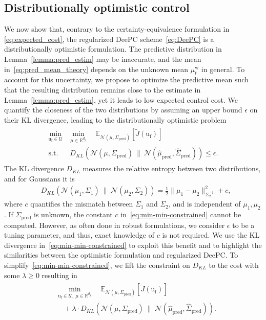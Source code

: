\documentclass[letterpaper, 10 pt, conference]{ieeeconf}
\def\ufr{\mathrm{u}_\mathrm{f}}
\def\mph{\hat{\mu}_\mathrm{pred}}
\def\mw{\mu^\mathrm{w}_t}
\def\Sp{\Sigma_\mathrm{pred}}
\def\Sph{\hat{\Sigma}_\mathrm{pred}}
\def\dy{d_\mathrm{y}}
\begin{document}
\subsection{Distributionally optimistic control}
We now show that, contrary to the certainty-equivalence formulation in \eqref{eq:expected_cost}, the regularized \gls{DeePC} scheme~\eqref{eq:DeePC} is a distributionally optimistic formulation.
The predictive distribution in Lemma~\ref{lemma:pred_estim} may be inaccurate, and the mean in~\eqref{eq:pred_mean_theory} depends on the unknown mean $\mw$ in general.
To account for this uncertainty, we propose to 
optimize the predictive mean such that the resulting distribution remains close to the estimate in Lemma~\ref{lemma:pred_estim}, yet it leads to low expected control cost. 
We quantify the closeness of the two distributions by assuming an upper bound $\epsilon$ on their \gls{KL} divergence, leading to the distributionally optimistic problem
\begin{align} \label{eq:min-min-constrained}
\begin{split}
    \min_{\ufr \in \mathcal{U}} & \min_{\mu\in\mathbb{R}^{\dy}}  \quad  \mathbb{E}_{\mathcal{N}(\mu,\Sp)}[\tilde{J}(\ufr)] \\
    \mathrm{s.t.} & ~ D_{KL}\left(\mathcal{N}(\mu,\Sp)~\big\|~\mathcal{N}\left(\mph,
    \Sph\right) \right) \leq \epsilon.
\end{split}
\end{align}
The \gls{KL} divergence $D_{KL}$ measures the relative entropy between two distributions, and for Gaussians it is~\cite{williams2006gaussian}
\begin{align*}
     &D_{KL}\left(\mathcal{N}(\mu_1,\Sigma_1)~\big\|~\mathcal{N}(\mu_2,\Sigma_2)\right) = \frac{1}{2}\|\mu_1-\mu_2\|_{\Sigma_2^{-1}}^2 + c,
\end{align*}
where $c$ quantifies the mismatch between $\Sigma_1$ and $\Sigma_2$, and is independent of $\mu_1,\mu_2$.
If $\Sp$ is unknown, the constant $c$ in~\eqref{eq:min-min-constrained} cannot be computed.
However, as often done in robust formulations, we consider $\epsilon$ to be a tuning parameter, and thus, exact knowledge of $c$ is not required.
We use the \gls{KL} divergence in~\eqref{eq:min-min-constrained} to exploit this benefit and to highlight the similarities between the optimistic formulation and regularized \gls{DeePC}.
To simplify~\eqref{eq:min-min-constrained}, we lift the constraint on $D_{KL}$ to the cost with some $\lambda\geq0$ resulting in 
\begin{align} \label{eq:min_min}
\begin{split}
    & \min_{\ufr\in\mathcal{U},~\mu\in \mathbb{R}^{\dy}} \quad  \mathbb{E}_{\mathcal{N}(\mu,\Sp)}[\tilde{J}(\ufr)] \\
    & \quad + \lambda \cdot D_{KL}\left(\mathcal{N}(\mu,\Sp)~\big\|~\mathcal{N}\left(\mph,\Sph\right) \right).
\end{split}
\end{align}
\end{document}
